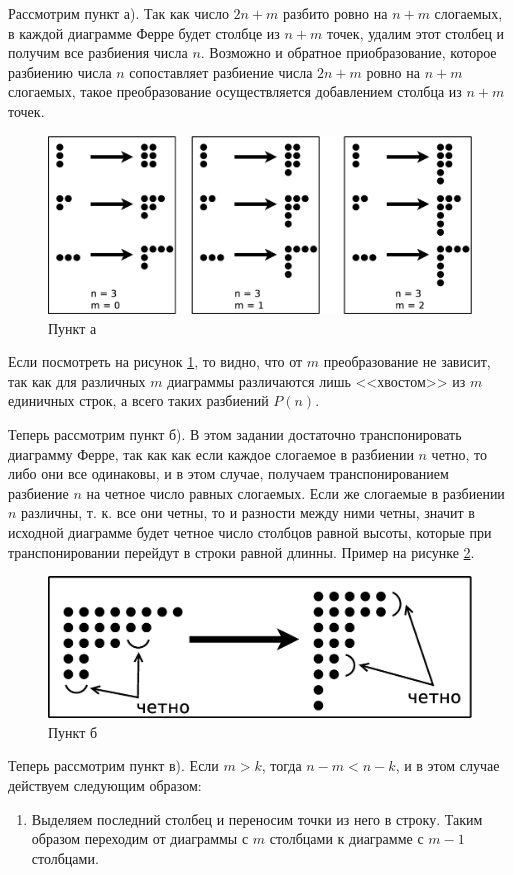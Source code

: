 \documentclass[a4paper,12pt]{article}
\begin{document}
\begin{Solution}
Рассмотрим пункт а). Так как число $2n + m$ разбито ровно на $n+m$ слогаемых, в каждой диаграмме Ферре будет столбце из $n+m$ точек, удалим этот столбец и получим все разбиения числа $n$. Возможно и обратное приобразование, которое разбиению числа $n$ сопоставляет разбиение числа $2n + m$ ровно на $n+m$ слогаемых, такое преобразование осуществляется добавлением столбца из $n+m$ точек.

\begin{figure}[h]
\begin{center}
\noindent\includegraphics[width=0.4\linewidth]{ferre1}
\caption{Пункт а}
\label{img::ferre1}
\end{center}
\end{figure}
Если посмотреть на рисунок \ref{img::ferre1}, то видно, что от $m$ преобразование не зависит, так как для различных $m$ диаграммы различаются лишь <<хвостом>> из $m$ единичных строк, а всего таких разбиений $P\left(n\right)$.

Теперь рассмотрим пункт б). В этом задании достаточно транспонировать диаграмму Ферре, так как как если каждое слогаемое в разбиении $n$ четно, то либо они все одинаковы, и в этом случае, получаем транспонированием разбиение $n$ на четное число равных слогаемых. Если же слогаемые в разбиении $n$ различны, т. к. все они четны, то и разности между ними четны, значит в исходной диаграмме будет четное число столбцов равной высоты, которые при транспонировании перейдут в строки равной длинны. Пример на рисунке \ref{img::ferre2}.

\begin{figure}[h]
\begin{center}
\noindent\includegraphics[width=0.4\linewidth]{ferre2}
\end{center}
\caption{Пункт б}
\label{img::ferre2}
\end{figure}

Теперь рассмотрим пункт в). Если $m > k$, тогда $n-m < n-k$, и в этом случае действуем следующим образом:
\begin{enumerate}
\item Выделяем последний столбец и переносим точки из него в строку. Таким образом переходим от диаграммы с $m$ столбцами к диаграмме с $m-1$ столбцами.


\end{enumerate}
\end{Solution}
\end{document}
